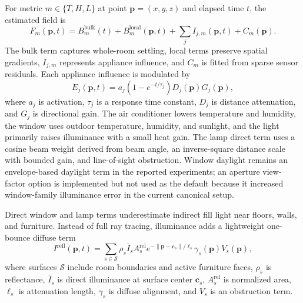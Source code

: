 \documentclass[conference,a4paper]{IEEEtran}
\begin{document}
For metric $m\in\{T,H,L\}$ at point $\mathbf{p}=(x,y,z)$ and elapsed time $t$, the estimated field is
\begin{equation}
F_m(\mathbf{p},t)=B_m^{\mathrm{bulk}}(t)+B_m^{\mathrm{local}}(\mathbf{p},t)+\sum_j I_{j,m}(\mathbf{p},t)+C_m(\mathbf{p}).
\end{equation}
The bulk term captures whole-room settling, local terms preserve spatial gradients, $I_{j,m}$ represents appliance influence, and $C_m$ is fitted from sparse sensor residuals. Each appliance influence is modulated by
\begin{equation}
E_j(\mathbf{p},t)=a_j(1-e^{-t/\tau_j})D_j(\mathbf{p})G_j(\mathbf{p}),
\end{equation}
where $a_j$ is activation, $\tau_j$ is a response time constant, $D_j$ is distance attenuation, and $G_j$ is directional gain. The air conditioner lowers temperature and humidity, the window uses outdoor temperature, humidity, and sunlight, and the light primarily raises illuminance with a small heat gain. The lamp direct term uses a cosine beam weight derived from beam angle, an inverse-square distance scale with bounded gain, and line-of-sight obstruction. Window daylight remains an envelope-based daylight term in the reported experiments; an aperture view-factor option is implemented but not used as the default because it increased window-family illuminance error in the current canonical setup.

Direct window and lamp terms underestimate indirect fill light near floors, walls, and furniture. Instead of full ray tracing, illuminance adds a lightweight one-bounce diffuse term
\begin{equation}
I^{\mathrm{refl}}(\mathbf{p},t)=\sum_{s\in\mathcal{S}}\rho_s\bar I_sA_s^{\mathrm{rel}}e^{-\|\mathbf{p}-\mathbf{c}_s\|/\ell_s}\gamma_s(\mathbf{p})V_s(\mathbf{p}),
\end{equation}
where surfaces $\mathcal{S}$ include room boundaries and active furniture faces, $\rho_s$ is reflectance, $\bar I_s$ is direct illuminance at surface center $\mathbf{c}_s$, $A_s^{\mathrm{rel}}$ is normalized area, $\ell_s$ is attenuation length, $\gamma_s$ is diffuse alignment, and $V_s$ is an obstruction term.
\end{document}
